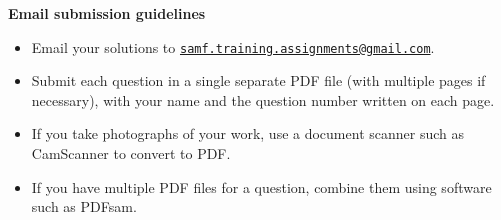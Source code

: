 \documentclass{article}
\begin{document}
\vfill
\textbf{\Large Email submission guidelines}
\begin{itemize}
	\item Email your solutions to \href{mailto:samf.training.assignments@gmail.com}{\texttt{samf.training.assignments@gmail.com}}.
	\item Submit each question in a single separate PDF file (with multiple pages if necessary), with your name and the question number written on each page.
	\item If you take photographs of your work, use a document scanner such as CamScanner to convert to PDF.
	\item If you have multiple PDF files for a question, combine them using software such as PDFsam.
\end{itemize}
\end{document}
